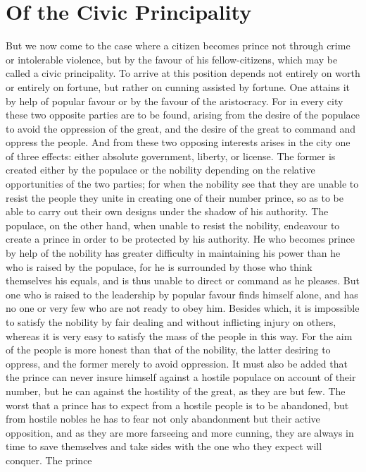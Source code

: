 \documentclass[12pt,letterpaper]{memoir}
\begin{document}
\chapter{Of the Civic Principality}

But we now come to the case where a citizen becomes prince not
through crime or intolerable violence, but by the favour of his
fellow-citizens, which may be called a civic principality. To arrive
at this position depends not entirely on worth or entirely on fortune,
but rather on cunning assisted by fortune. One attains it by help of
popular favour or by the favour of the aristocracy. For in every city
these two opposite parties are to be found, arising from the desire
of the populace to avoid the oppression of the great, and the desire
of the great to command and oppress the people. And from these two
opposing interests arises in the city one of three effects: either
absolute government, liberty, or license. The former is created either
by the populace or the nobility depending on the relative opportunities
of the two parties; for when the nobility see that they are unable to
resist the people they unite in creating one of their number prince,
so as to be able to carry out their own designs under the shadow of
his authority. The populace, on the other hand, when unable to resist
the nobility, endeavour to create a prince in order to be protected
by his authority. He who becomes prince by help of the nobility has
greater difficulty in maintaining his power than he who is raised by
the populace, for he is surrounded by those who think themselves his
equals, and is thus unable to direct or command as he pleases. But one
who is raised to the leadership by popular favour finds himself alone,
and has no one or very few who are not ready to obey him. Besides
which, it is impossible to satisfy the nobility by fair dealing and
without inflicting injury on others, whereas it is very easy to satisfy
the mass of the people in this way. For the aim of the people is more
honest than that of the nobility, the latter desiring to oppress, and
the former merely to avoid oppression. It must also be added that the
prince can never insure himself against a hostile populace on account
of their number, but he can against the hostility of the great, as
they are but few. The worst that a prince has to expect from a hostile
people is to be abandoned, but from hostile nobles he has to fear not
only abandonment but their active opposition, and as they are more
farseeing and more cunning, they are always in time to save themselves
and take sides with the one who they expect will conquer. The prince
\end{document}
